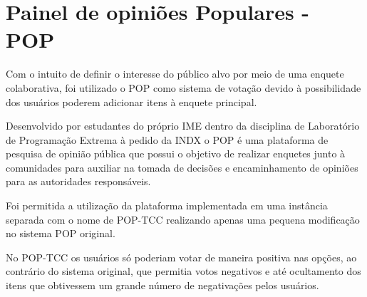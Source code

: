 \section{Painel de opiniões Populares - POP}
\par Com o intuito de definir o interesse do público alvo por meio de uma enquete colaborativa, foi utilizado o POP como sistema de votação devido à possibilidade dos usuários poderem adicionar itens à enquete principal.
\par Desenvolvido por estudantes do próprio IME dentro da disciplina de Laboratório de Programação Extrema à pedido da INDX o POP é uma plataforma de pesquisa de opinião pública que possui o objetivo de realizar enquetes junto à comunidades para auxiliar na tomada de decisões e encaminhamento de opiniões para as autoridades responsáveis.
\par Foi permitida a utilização da plataforma implementada em uma instância separada com o nome de POP-TCC realizando apenas uma pequena modificação no sistema POP original.
\par No POP-TCC os usuários só poderiam votar de maneira positiva nas opções, ao contrário do sistema original, que permitia votos negativos e até ocultamento dos itens que obtivessem um grande número de negativações pelos usuários.

